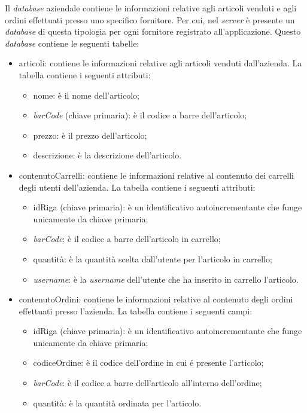 \documentclass[12pt, a4paper, titlepage]{report}
\begin{document}
	Il \textit{database} aziendale contiene le informazioni relative agli articoli venduti e agli ordini effettuati presso uno specifico fornitore. Per cui, nel \textit{server} è presente un \textit{database} di questa tipologia per ogni fornitore registrato all'applicazione. Questo \textit{database} contiene le seguenti tabelle:
	\begin{itemize}
		\item articoli: contiene le informazioni relative agli articoli venduti dall'azienda. La tabella contiene i seguenti attributi:
		\begin{itemize}
			\item nome: è il nome dell'articolo;
			\item \textit{barCode} (chiave primaria): è il codice a barre dell'articolo;
			\item prezzo: è il prezzo dell'articolo;
			\item descrizione: è la descrizione dell'articolo.
		\end{itemize}
		\item contenutoCarrelli: contiene le informazioni relative al contenuto dei carrelli degli utenti dell'azienda. La tabella contiene i seguenti attributi:
		\begin{itemize}
			\item idRiga (chiave primaria): è un identificativo autoincrementante che funge unicamente da chiave primaria;
			\item \textit{barCode}: è il codice a barre dell'articolo in carrello;
			\item quantità: è la quantità scelta dall'utente per l'articolo in carrello;
			\item \textit{username}: è la \textit{username} dell'utente che ha inserito in carrello l'articolo.
		\end{itemize}
		\item contenutoOrdini: contiene le informazioni relative al contenuto degli ordini effettuati presso l'azienda. La tabella contiene i seguenti campi:
		\begin{itemize}
			\item idRiga (chiave primaria): è un identificativo autoincrementante che funge unicamente da chiave primaria;
			\item codiceOrdine: è il codice dell'ordine in cui é presente l'articolo;
			\item \textit{barCode}: è il codice a barre dell'articolo all'interno dell'ordine;
			\item quantità: è la quantità ordinata per l'articolo.

\end{itemize}
\end{itemize}
\end{document}
